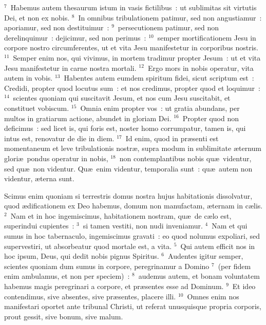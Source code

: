 ${}^{7}$~Habemus autem thesaurum istum in vasis fictilibus~: ut sublimitas sit virtutis Dei, et non ex nobis.
${}^{8}$~In omnibus tribulationem patimur, sed non angustiamur~: aporiamur, sed non destituimur~:
${}^{9}$~persecutionem patimur, sed non derelinquimur~: dejicimur, sed non perimus~:
${}^{10}$~semper mortificationem Jesu in corpore nostro circumferentes, ut et vita Jesu manifestetur in corporibus nostris.
${}^{11}$~Semper enim nos, qui vivimus, in mortem tradimur propter Jesum~: ut et vita Jesu manifestetur in carne nostra mortali.
${}^{12}$~Ergo mors in nobis operatur, vita autem in vobis.
${}^{13}$~Habentes autem eumdem spiritum fidei, sicut scriptum est~: Credidi, propter quod locutus sum~: et nos credimus, propter quod et loquimur~:
${}^{14}$~scientes quoniam qui suscitavit Jesum, et nos cum Jesu suscitabit, et constituet vobiscum.
${}^{15}$~Omnia enim propter vos~: ut gratia abundans, per multos in gratiarum actione, abundet in gloriam Dei.
${}^{16}$~Propter quod non deficimus~: sed licet is, qui foris est, noster homo corrumpatur, tamen is, qui intus est, renovatur de die in diem.
${}^{17}$~Id enim, quod in pr\ae senti est momentaneum et leve tribulationis nostr\ae , supra modum in sublimitate \ae ternum glori\ae\ pondus operatur in nobis,
${}^{18}$~non contemplantibus nobis qu\ae\ videntur, sed qu\ae\ non videntur. Qu\ae\ enim videntur, temporalia sunt~: qu\ae\ autem non videntur, \ae terna sunt.

\lettrine[lines=3,image=true,loversize=0.05,lraise=-0.03]{S}{}cimus enim quoniam si terrestris domus nostra hujus habitationis dissolvatur, quod \ae dificationem ex Deo habemus, domum non manufactam, \ae ternam in c\ae lis.
${}^{2}$~Nam et in hoc ingemiscimus, habitationem nostram, qu\ae\ de c\ae lo est, superindui cupientes~:
${}^{3}$~si tamen vestiti, non nudi inveniamur.
${}^{4}$~Nam et qui sumus in hoc tabernaculo, ingemiscimus gravati~: eo quod nolumus expoliari, sed supervestiri, ut absorbeatur quod mortale est, a vita.
${}^{5}$~Qui autem efficit nos in hoc ipsum, Deus, qui dedit nobis pignus Spiritus.
${}^{6}$~Audentes igitur semper, scientes quoniam dum sumus in corpore, peregrinamur a Domino
${}^{7}$~(per fidem enim ambulamus, et non per speciem)~:
${}^{8}$~audemus autem, et bonam voluntatem habemus magis peregrinari a corpore, et pr\ae sentes esse ad Dominum.
${}^{9}$~Et ideo contendimus, sive absentes, sive pr\ae sentes, placere illi.
${}^{10}$~Omnes enim nos manifestari oportet ante tribunal Christi, ut referat unusquisque propria corporis, prout gessit, sive bonum, sive malum.


